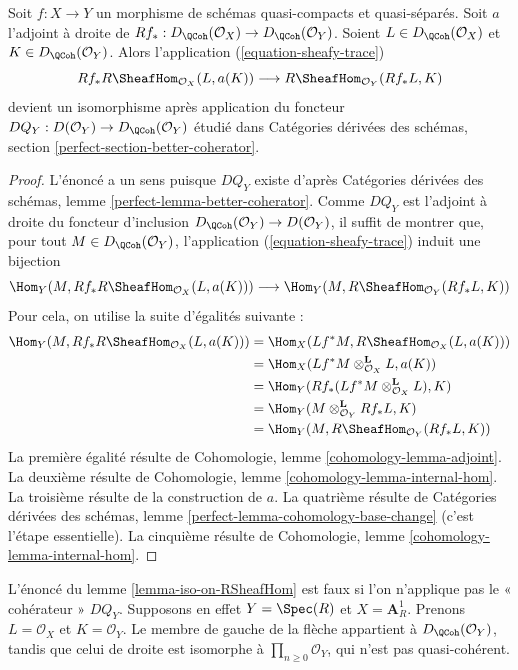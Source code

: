 \begin{lemma}
\label{lemma-iso-on-RSheafHom}
Soit $f : X \to Y$ un morphisme de schémas quasi-compacts et quasi-séparés. Soit $a$ l'adjoint à droite de $Rf_* : D_\QCoh(\mathcal{O}_X) \to D_\QCoh(\mathcal{O}_Y)$. Soient $L \in D_\QCoh(\mathcal{O}_X)$ et $K \in D_\QCoh(\mathcal{O}_Y)$. Alors l'application (\ref{equation-sheafy-trace})
$$
Rf_*R\SheafHom_{\mathcal{O}_X}(L, a(K))
\longrightarrow
R\SheafHom_{\mathcal{O}_Y}(Rf_*L, K)
$$
\begingroup\emergencystretch=16pt
devient un isomorphisme après application du foncteur
$DQ_Y : D(\mathcal{O}_Y) \to D_\QCoh(\mathcal{O}_Y)$
étudié dans Catégories dérivées des schémas, section \ref{perfect-section-better-coherator}.\par\endgroup
\end{lemma}

\begin{proof}
L'énoncé a un sens puisque $DQ_Y$ existe d'après Catégories dérivées des schémas, lemme \ref{perfect-lemma-better-coherator}. Comme $DQ_Y$ est l'adjoint à droite du foncteur d'inclusion $D_\QCoh(\mathcal{O}_Y) \to D(\mathcal{O}_Y)$, il suffit de montrer que, pour tout $M \in D_\QCoh(\mathcal{O}_Y)$, l'application (\ref{equation-sheafy-trace}) induit une bijection
$$
\Hom_Y(M, Rf_*R\SheafHom_{\mathcal{O}_X}(L, a(K)))
\longrightarrow
\Hom_Y(M, R\SheafHom_{\mathcal{O}_Y}(Rf_*L, K))
$$
Pour cela, on utilise la suite d'égalités suivante :
\begin{align*}
\Hom_Y(M, Rf_*R\SheafHom_{\mathcal{O}_X}(L, a(K)))
& =
\Hom_X(Lf^*M, R\SheafHom_{\mathcal{O}_X}(L, a(K))) \\
& =
\Hom_X(Lf^*M \otimes_{\mathcal{O}_X}^\mathbf{L} L, a(K)) \\
& =
\Hom_Y(Rf_*(Lf^*M \otimes_{\mathcal{O}_X}^\mathbf{L} L), K) \\
& =
\Hom_Y(M \otimes_{\mathcal{O}_Y}^\mathbf{L} Rf_*L, K) \\
& =
\Hom_Y(M, R\SheafHom_{\mathcal{O}_Y}(Rf_*L, K))
\end{align*}
La première égalité résulte de Cohomologie, lemme \ref{cohomology-lemma-adjoint}. La deuxième résulte de Cohomologie, lemme \ref{cohomology-lemma-internal-hom}. La troisième résulte de la construction de $a$. La quatrième résulte de Catégories dérivées des schémas, lemme \ref{perfect-lemma-cohomology-base-change} (c'est l'étape essentielle). La cinquième résulte de Cohomologie, lemme \ref{cohomology-lemma-internal-hom}.
\end{proof}

\begin{example}
\label{example-iso-on-RSheafHom}
L'énoncé du lemme \ref{lemma-iso-on-RSheafHom} est faux si l'on n'applique pas le « cohérateur » $DQ_Y$. Supposons en effet $Y = \Spec(R)$ et $X = \mathbf{A}^1_R$. Prenons $L = \mathcal{O}_X$ et $K = \mathcal{O}_Y$. Le membre de gauche de la flèche appartient à $D_\QCoh(\mathcal{O}_Y)$, tandis que celui de droite est isomorphe à $\prod_{n \geq 0} \mathcal{O}_Y$, qui n'est pas quasi-cohérent.
\end{example}

